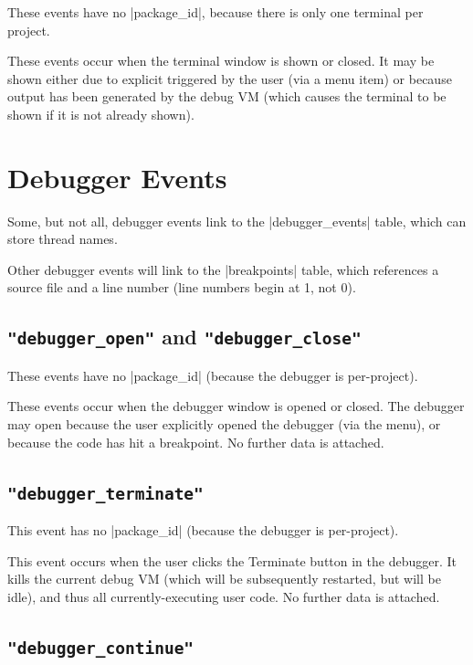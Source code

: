\documentclass{report}
\newcommand{\myref}[1]{\autoref{#1} on page \pageref*{#1}}
\newcommand{\intern}{This table may be interned, see \myref{def:intern}.}
\begin{document}
These events have no |package_id|, because there is only one terminal
per project.

These events occur when the terminal window is shown or closed.  It
may be shown either due to explicit triggered by the user (via a menu
item) or because output has been generated by the debug VM (which
causes the terminal to be shown if it is not already shown).

\section{Debugger Events}

Some, but not all, debugger events link to the |debugger_events|
table, which can store thread names.


Other debugger events will link to the |breakpoints| table, which references a
source file and a line number (line numbers begin at 1, not 0).


\subsection{\lstinline!"debugger_open"! and \lstinline!"debugger_close"!}

These events have no |package_id| (because the debugger is per-project).

These events occur when the debugger window is opened or closed.  The debugger
may open because the user explicitly opened the debugger (via the menu), or
because the code has hit a breakpoint.  No further data is attached.

\subsection{\lstinline!"debugger_terminate"!}

This event has no |package_id| (because the debugger is per-project).

This event occurs when the user clicks the Terminate button in the debugger.
It kills the current debug VM (which will be subsequently restarted, but will
be idle), and thus all currently-executing user code.  No
further data is attached.

\subsection{\lstinline!"debugger_continue"!}
\end{document}

